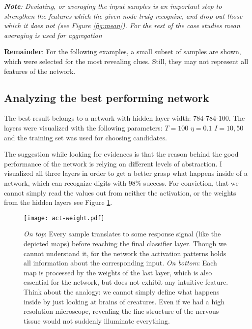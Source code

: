 \emph{\textbf{Note}: Deviating, or averaging the input samples is an important step to strengthen the features which the given node truly recognize, and drop out those which it does not (see Figure \ref{fig:mean}). For the rest of the case studies mean averaging is used for aggregation}

\textbf{Remainder}: For the following examples, a small subset of samples are shown, which were selected for the most revealing clues. Still, they may not represent all features of the network.


\subsection{Analyzing the best performing network}
The best result belongs to a network with hidden layer width: 784-784-100. 
The layers were visualized with the following parameters:
$T=100$
$\eta=0.1$
$I=10, 50$
and the training set was used for choosing candidates.

The suggestion while looking for evidences is that the reason behind the good performance of the network is relying on different levels of abstraction.
I visualized all three layers in order to get a better grasp what happens inside of a network, which can recognize digits with $98\%$ success.
For conviction, that we cannot simply read the values out from neither the activation, or the weights from the hidden layers see Figure \ref{fig:act-weight}.

\begin{figure}
    \centering
    \texttt{[image: act-weight.pdf]}
    \caption{\emph{On top}: Every sample translates to some response signal (like the depicted maps) before reaching the final classifier layer. 
    Though we cannot understand it, for the network the activation patterns holds all information about the corresponding input.
    \emph{On bottom}: Each map is processed by the weights of the last layer, which is also essential for the network, but does not exhibit any intuitive feature.
    Think about the analogy: we cannot simply define what happens inside by just looking at brains of creatures. 
    Even if we had a high resolution microscope, revealing the fine structure of the nervous tissue would not suddenly illuminate everything.
    }
    \label{fig:act-weight}
\end{figure}

